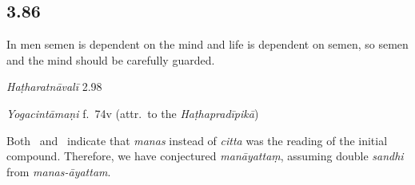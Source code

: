 \begin{ekdosis}
\subsection*{3.86}
\begin{translation}[hp03_086]
In men semen is dependent on the mind and life is dependent on semen, so semen and the mind should be carefully guarded.
\end{translation}


\begin{testimonia}[hp03_086]
\emph{Haṭharatnāvalī} 2.98
\begin{versinnote}
\end{versinnote}

\emph{Yogacintāmaṇi} f.~74v (attr.~to the \emph{Haṭhapradīpikā})
\begin{versinnote}
\end{versinnote}

\end{testimonia}

\begin{philcomm}[hp03_086]
Both \alphaTwo\ and \alphaThree\ indicate that \textit{manas} instead of \textit{citta} was the reading of the initial compound. Therefore, we have conjectured \textit{manāyattaṃ}, assuming double \textit{sandhi} from \emph{manas-āyattam}. 
\end{philcomm}


\end{ekdosis}
